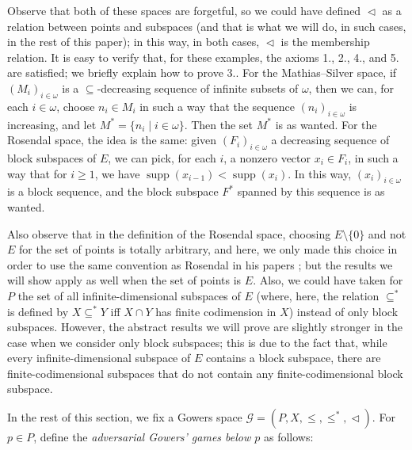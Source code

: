 \documentclass[a4paper,11pt]{article}
\theoremstyle{definition}
\numberwithin{equation}{section}
\newcommand{\G}{\mathcal{G}}
\DeclareMathOperator{\supp}{supp}
\begin{document}
Observe that both of these spaces are forgetful, so we could have defined $\vartriangleleft$ as a relation between points and subspaces (and that is what we will do, in such cases, in the rest of this paper); in this way, in both cases, $\vartriangleleft$ is the membership relation. It is easy to verify that, for these examples, the axioms 1., 2., 4., and 5. are satisfied; we briefly explain how to prove 3.. For the Mathias--Silver space, if $(M_i)_{i \in \omega}$ is a $\subseteq$-decreasing sequence of infinite subsets of $\omega$, then we can, for each $i \in \omega$, choose $n_i \in M_i$ in such a way that the sequence $(n_i)_{i \in \omega}$ is increasing, and let $M^* = \{n_i \mid i \in \omega\}$. Then the set $M^*$ is as wanted. For the Rosendal space, the idea is the same: given $(F_i)_{i \in \omega}$ a decreasing sequence of block subspaces of $E$, we can pick, for each $i$, a nonzero vector $x_i \in F_i$, in such a way that for $i \geqslant 1$, we have $\supp(x_{i - 1}) < \supp(x_i)$. In this way, $(x_i)_{i \in \omega}$ is a block sequence, and the block subspace $F^*$ spanned by this sequence is as wanted.

\smallskip

Also observe that in the definition of the Rosendal space, choosing $E\setminus\{0\}$ and not $E$ for the set of points is totally arbitrary, and here, we only made this choice in order to use the same convention as Rosendal in his papers \cite{RosendalGowers, Rosendaladverse}; but the results we will show apply as well when the set of points is $E$. Also, we could have taken for $P$ the set of all infinite-dimensional subspaces of $E$ (where, here, the relation $\subseteq^*$ is defined by $X \subseteq^* Y$ iff $X \cap Y$ has finite codimension in $X$) instead of only block subspaces. However, the abstract results we will prove are slightly stronger in the case when we consider only block subspaces; this is due to the fact that, while every infinite-dimensional subspace of $E$ contains a block subspace, there are finite-codimensional subspaces that do not contain any finite-codimensional block subspace.

\smallskip

In the rest of this section, we fix a Gowers space $\G = (P, X, \leqslant, \leqslant^*, \vartriangleleft)$. For $p \in P$, define the \emph{adversarial Gowers' games below $p$} as follows:
\end{document}
